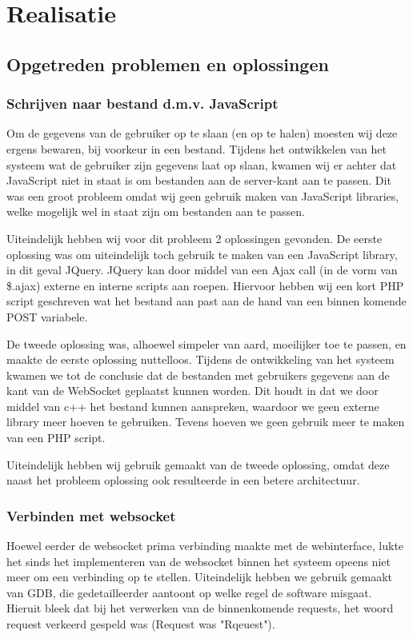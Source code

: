 \chapter{Realisatie}

\section{Opgetreden problemen en oplossingen}
\subsection{Schrijven naar bestand d.m.v. JavaScript}
Om de gegevens van de gebruiker op te slaan (en op te halen) moesten wij deze ergens bewaren, bij voorkeur in een bestand.
Tijdens het ontwikkelen van het systeem wat de gebruiker zijn gegevens laat op slaan, kwamen wij er achter dat JavaScript niet in staat is om bestanden aan de server-kant aan te passen.
Dit was een groot probleem omdat wij geen gebruik maken van JavaScript libraries, welke mogelijk wel in staat zijn om bestanden aan te passen.

Uiteindelijk hebben wij voor dit probleem 2 oplossingen gevonden.
De eerste oplossing was om uiteindelijk toch gebruik te maken van een JavaScript library, in dit geval JQuery.
JQuery kan door middel van een Ajax call (in de vorm van \$.ajax) externe en interne scripts aan roepen.
Hiervoor hebben wij een kort PHP script geschreven wat het bestand aan past aan de hand van een binnen komende POST variabele.

De tweede oplossing was, alhoewel simpeler van aard, moeilijker toe te passen, en maakte de eerste oplossing nuttelloos.
Tijdens de ontwikkeling van het systeem kwamen we tot de conclusie dat de bestanden met gebruikers gegevens aan de kant van de WebSocket geplaatst kunnen worden.
Dit houdt in dat we door middel van c++ het bestand kunnen aanspreken, waardoor we geen externe library meer hoeven te gebruiken. Tevens hoeven we geen gebruik meer te maken van een PHP script.

Uiteindelijk hebben wij gebruik gemaakt van de tweede oplossing, omdat deze naast het probleem oplossing ook resulteerde in een betere architectuur.

\subsection{Verbinden met websocket}
Hoewel eerder de websocket prima verbinding maakte met de webinterface, lukte het sinds het implementeren van de websocket binnen het systeem opeens niet meer om een verbinding op te stellen.
Uiteindelijk hebben we gebruik gemaakt van GDB, die gedetailleerder aantoont op welke regel de software misgaat.
Hieruit bleek dat bij het verwerken van de binnenkomende requests, het woord request verkeerd gespeld was (Request was "Rqeuest").

